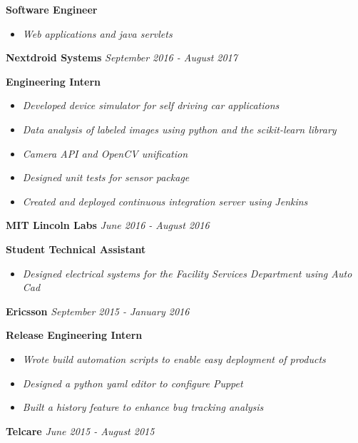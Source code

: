 \documentclass[8pt]{extarticle}
\begin{document}
{\tiny }
\textbf{Software Engineer}
\begin{itemize}
\item \textit{Web applications and java servlets}
\end{itemize}
\textbf{Nextdroid Systems} \textit{September 2016 - August 2017}

{\tiny }
\textbf{Engineering Intern} 
\begin{itemize}
\item \textit{Developed device simulator for self driving car applications}
\item \textit{Data analysis of labeled images using python and the scikit-learn library}
\item \textit{Camera API and OpenCV unification}
\item \textit{Designed unit tests for sensor package}
\item \textit{Created and deployed continuous integration server using Jenkins}
\end{itemize}
\textbf{MIT Lincoln Labs} \textit{June  2016 - August 2016}

\textbf{Student Technical Assistant } 
\begin{itemize}
\item \textit{Designed electrical systems for the Facility Services Department using Auto Cad}
\end{itemize}
\textbf{Ericsson} \textit{September  2015 - January 2016}

\textbf{Release Engineering Intern } 
\begin{itemize}
\item \textit{Wrote build automation scripts to enable easy deployment of products}
\item \textit{Designed a python yaml editor to configure Puppet}
\item \textit{Built a history feature to enhance bug tracking analysis}

\end{itemize}
\textbf{Telcare} \textit{June  2015 - August 2015}
\end{document}
